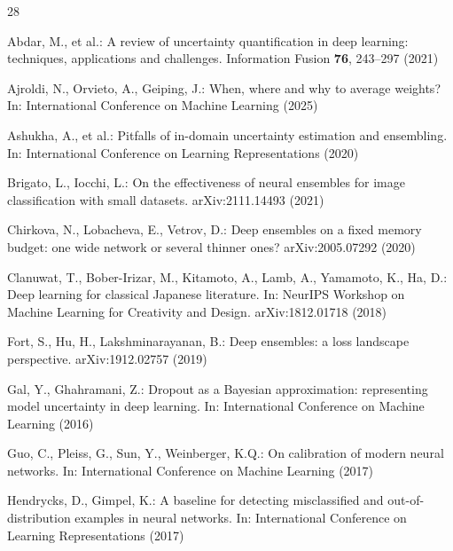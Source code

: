 \documentclass[11pt,a4paper]{article}
\begin{document}
\begin{thebibliography}{28}
\small
\setlength{\itemsep}{1pt}

 Abdar, M., et al.: A review of
uncertainty quantification in deep learning: techniques, applications and
challenges. Information Fusion \textbf{76}, 243--297 (2021)

 Ajroldi, N., Orvieto, A.,
Geiping, J.: When, where and why to average weights? In: International
Conference on Machine Learning (2025)

 Ashukha, A., et al.: Pitfalls
of in-domain uncertainty estimation and ensembling. In: International
Conference on Learning Representations (2020)

 Brigato, L., Iocchi, L.:
On the effectiveness of neural ensembles for image classification with
small datasets. arXiv:2111.14493 (2021)

 Chirkova, N., Lobacheva,
E., Vetrov, D.: Deep ensembles on a fixed memory budget: one wide network
or several thinner ones? arXiv:2005.07292 (2020)

 Clanuwat, T., Bober-Irizar,
M., Kitamoto, A., Lamb, A., Yamamoto, K., Ha, D.: Deep learning for
classical Japanese literature. In: NeurIPS Workshop on Machine Learning for
Creativity and Design. arXiv:1812.01718 (2018)

 Fort, S., Hu, H., Lakshminarayanan,
B.: Deep ensembles: a loss landscape perspective. arXiv:1912.02757 (2019)

 Gal, Y., Ghahramani, Z.:
Dropout as a Bayesian approximation: representing model uncertainty in deep
learning. In: International Conference on Machine Learning (2016)

 Guo, C., Pleiss, G., Sun, Y.,
Weinberger, K.Q.: On calibration of modern neural networks. In:
International Conference on Machine Learning (2017)

 Hendrycks, D., Gimpel,
K.: A baseline for detecting misclassified and out-of-distribution
examples in neural networks. In: International Conference on Learning
Representations (2017)


\end{thebibliography}
\end{document}
